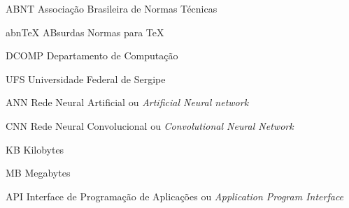 
\begin{siglas}
	\item[ABNT]{Associação Brasileira de Normas Técnicas}
	\item[abnTeX]{ABsurdas Normas para TeX}
  	\item[DCOMP]{Departamento de Computação}
	\item[UFS]{Universidade Federal de Sergipe}
	\item[ANN]{Rede Neural Artificial ou \textit{Artificial Neural network}}
	\item[CNN]{Rede Neural Convolucional ou \textit{Convolutional Neural Network}}
	\item[KB]{Kilobytes}
	\item[MB]{Megabytes}
	\item[API]{Interface de Programação de Aplicações ou \textit{Application Program Interface}}
\end{siglas}
